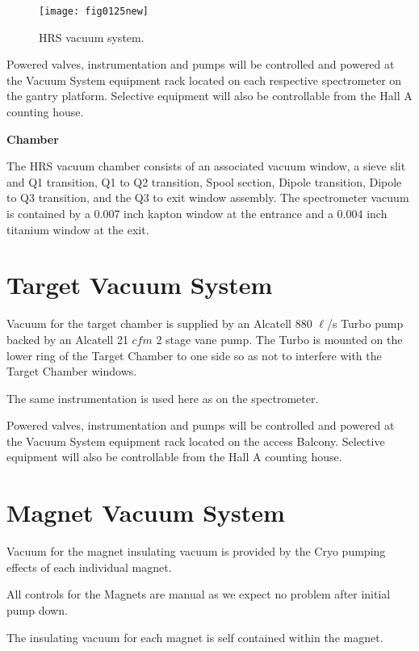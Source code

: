 \begin{figure}
\begin{center}
\texttt{[image: fig0125new]}
{\linespread{1.}
\caption[Spectrometers: HRS Vacuum System]{HRS vacuum system.}
\label{fig:hrs_vac_sys}}
\end{center}
\end{figure}

Powered valves, instrumentation and pumps will be controlled and powered 
at the Vacuum System equipment rack located on each respective 
spectrometer on the gantry platform.  Selective equipment will also be 
controllable from the Hall A counting house.

{\bf Chamber}

The HRS vacuum chamber consists of an associated vacuum window, a sieve 
slit and Q1 transition, Q1 to Q2 transition, Spool section, Dipole 
transition, Dipole to Q3 transition, and the Q3 to exit window assembly. 
 The spectrometer vacuum is contained by a 0.007 inch kapton window at the
 entrance and a 0.004 inch titanium window at the exit.

\section{Target Vacuum System}

Vacuum for the target chamber is supplied by an Alcatell 880 $\ell$/s 
Turbo pump backed by an Alcatell 21 $cfm$ 2 stage vane pump.  The Turbo is 
mounted on the lower ring of the Target Chamber to one side so as not to 
interfere with the Target Chamber windows.

The same instrumentation is used here as on the spectrometer.

Powered valves, instrumentation and pumps will be controlled and powered 
at the Vacuum System equipment rack located on the access Balcony.  
Selective equipment will also be controllable from the Hall A counting 
house. 

\section{Magnet Vacuum System}

Vacuum for the magnet insulating vacuum is provided by the Cryo
pumping effects of each individual magnet.

All controls for the Magnets are manual as we expect no problem after 
initial pump down.


The insulating vacuum for each magnet is self contained within the 
magnet.

